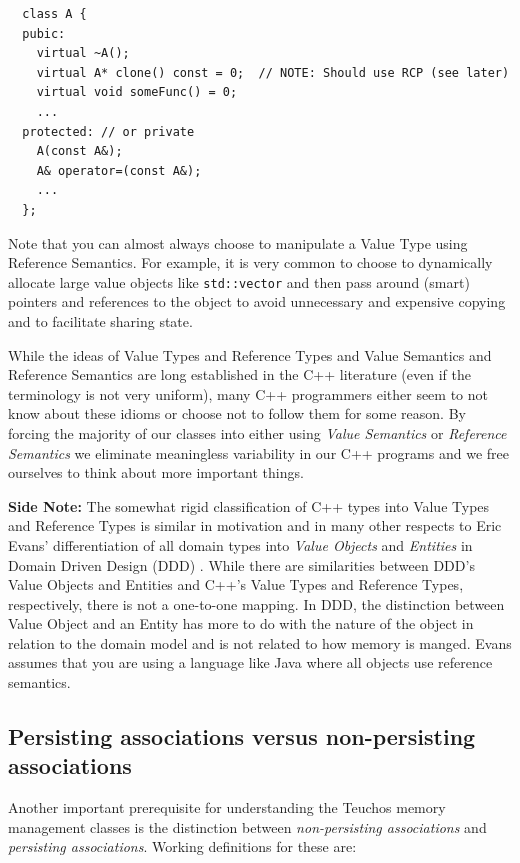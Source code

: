 \documentclass[pdf,ps2pdf,11pt]{SANDreport}
\begin{document}
{\small\begin{verbatim}
  class A {
  pubic:
    virtual ~A();
    virtual A* clone() const = 0;  // NOTE: Should use RCP (see later)
    virtual void someFunc() = 0;
    ...
  protected: // or private
    A(const A&);
    A& operator=(const A&);
    ...
  };
\end{verbatim}}

Note that you can almost always choose to manipulate a Value Type
using Reference Semantics.  For example, it is very common to choose
to dynamically allocate large value objects like
{}\texttt{std::vector} and then pass around (smart) pointers and
references to the object to avoid unnecessary and expensive copying
and to facilitate sharing state.

While the ideas of Value Types and Reference Types and Value Semantics
and Reference Semantics are long established in the C++ literature
(even if the terminology is not very uniform), many C++ programmers
either seem to not know about these idioms or choose not to follow them
for some reason.  By forcing the majority of our classes into either
using {}\textit{Value Semantics} or {}\textit{Reference Semantics} we
eliminate meaningless variability in our C++ programs and we free
ourselves to think about more important things.

{}\textbf{Side Note:} The somewhat rigid classification of C++ types
into Value Types and Reference Types is similar in motivation and in
many other respects to Eric Evans' differentiation of all domain types
into {}\textit{Value Objects} and {}\textit{Entities} in Domain Driven
Design (DDD) {}\cite{DomainDrivenDesign}.  While there are
similarities between DDD's Value Objects and Entities and C++'s Value
Types and Reference Types, respectively, there is not a one-to-one
mapping.  In DDD, the distinction between Value Object and an Entity
has more to do with the nature of the object in relation to the domain
model and is not related to how memory is manged.  Evans assumes that
you are using a language like Java where all objects use reference
semantics.


%
{}\subsection{Persisting associations versus non-persisting associations}
\label{sec:persisting-nonpersisting-associations}
%

Another important prerequisite for understanding the Teuchos memory
management classes is the distinction between {}\textit{non-persisting
associations} and {}\textit{persisting associations}.  Working
definitions for these are:
\end{document}
